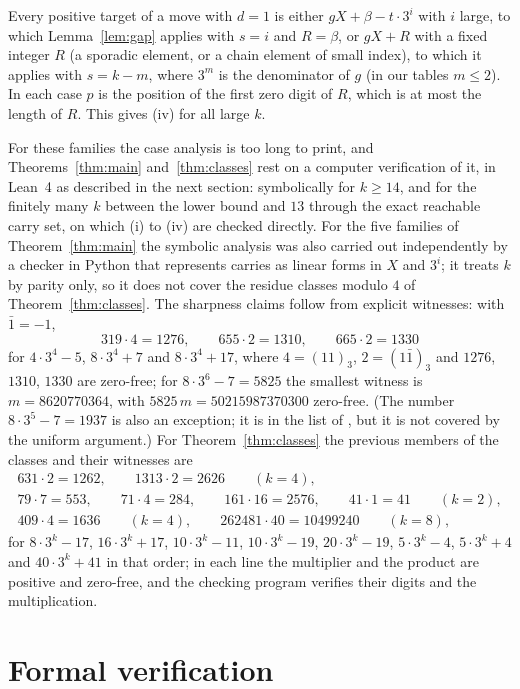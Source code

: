 \documentclass[11pt]{amsart}
\theoremstyle{definition}
\begin{document}
Every positive target of a move with $d=1$ is either $gX+\beta-t\cdot 3^i$ with $i$ large, to which
Lemma~\ref{lem:gap} applies with $s=i$ and $R=\beta$, or $gX+R$ with a fixed integer $R$ (a
sporadic element, or a chain element of small index), to which it applies with $s=k-m$, where $3^m$
is the denominator of $g$ (in our tables $m\le 2$). In each case
$p$ is the position of the first zero digit of $R$, which is at most the length of $R$. This gives
(iv) for all large $k$.

For these families the case analysis is too long to print, and Theorems~\ref{thm:main}
and~\ref{thm:classes} rest on a computer verification of it, in Lean~4 as described in the next
section: symbolically for $k\ge 14$, and for the finitely many $k$ between the lower bound and $13$
through the exact reachable carry set, on which (i) to (iv) are checked directly. For the five
families of Theorem~\ref{thm:main} the symbolic analysis was also carried out independently by a
checker in Python that represents carries as linear forms in $X$ and $3^i$; it treats $k$ by parity
only, so it does not cover the residue classes modulo $4$ of Theorem~\ref{thm:classes}. The sharpness claims follow from explicit witnesses: with $\bar 1=-1$,
\[
319\cdot 4=1276,\qquad 655\cdot 2=1310,\qquad 665\cdot 2=1330
\]
for $4\cdot 3^4-5$, $8\cdot 3^4+7$ and $8\cdot 3^4+17$, where $4=(11)_3$, $2=(1\bar 1)_3$ and
$1276$, $1310$, $1330$ are zero-free; for $8\cdot 3^6-7=5825$ the smallest witness is
$m=8620770364$, with $5825\,m=50215987370300$ zero-free. (The number $8\cdot 3^5-7=1937$ is also an
exception; it is in the list of \cite{BMRS}, but it is not covered by the uniform argument.) For
Theorem~\ref{thm:classes} the previous members of the classes and their witnesses are
\[
\begin{gathered}
631\cdot 2=1262,\qquad 1313\cdot 2=2626\qquad(k=4),\\
79\cdot 7=553,\qquad 71\cdot 4=284,\qquad 161\cdot 16=2576,\qquad 41\cdot 1=41\qquad(k=2),\\
409\cdot 4=1636\qquad(k=4),\qquad 262481\cdot 40=10499240\qquad(k=8),
\end{gathered}
\]
for $8\cdot 3^k-17$, $16\cdot 3^k+17$, $10\cdot 3^k-11$, $10\cdot 3^k-19$, $20\cdot 3^k-19$, $5\cdot 3^k-4$,
$5\cdot 3^k+4$ and $40\cdot 3^k+41$ in that order; in each line the multiplier and the product are positive and zero-free, and the
checking program verifies their digits and the multiplication.

\section{Formal verification}\label{sec:lean}
\end{document}

